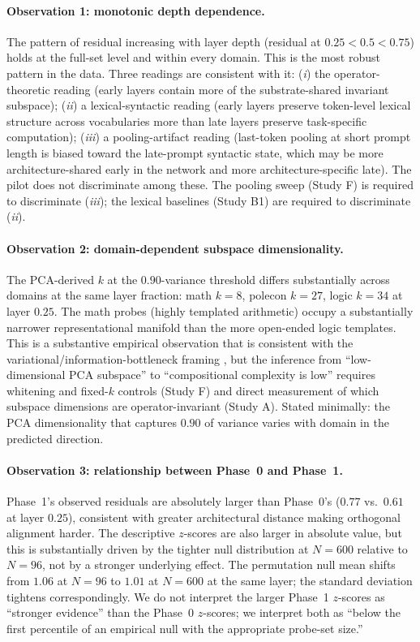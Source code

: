 \paragraph{Observation 1: monotonic depth dependence.} The pattern of
residual increasing with layer depth (residual at $0.25 < 0.5 < 0.75$)
holds at the full-set level and within every domain. This is the most
robust pattern in the data. Three readings are consistent with it:
(\emph{i}) the operator-theoretic reading (early layers contain more
of the substrate-shared invariant subspace); (\emph{ii}) a
lexical-syntactic reading (early layers preserve token-level lexical
structure across vocabularies more than late layers preserve
task-specific computation); (\emph{iii}) a pooling-artifact reading
(last-token pooling at short prompt length is biased toward the
late-prompt syntactic state, which may be more architecture-shared
early in the network and more architecture-specific late). The pilot
does not discriminate among these. The pooling sweep (Study F) is
required to discriminate (\emph{iii}); the lexical baselines (Study B1)
are required to discriminate (\emph{ii}).

\paragraph{Observation 2: domain-dependent subspace dimensionality.}
The PCA-derived $k$ at the $0.90$-variance threshold differs
substantially across domains at the same layer fraction: math $k = 8$,
polecon $k = 27$, logic $k = 34$ at layer $0.25$. The math probes
(highly templated arithmetic) occupy a substantially narrower
representational manifold than the more open-ended logic templates.
This is a substantive empirical observation that is consistent with
the variational/information-bottleneck framing
\cite{tishby2015deep, friston2010free, achille2018emergence}, but the
inference from ``low-dimensional PCA subspace'' to ``compositional
complexity is low'' requires whitening and fixed-$k$ controls (Study
F) and direct measurement of which subspace dimensions are
operator-invariant (Study A). Stated minimally: the PCA dimensionality
that captures $0.90$ of variance varies with domain in the predicted
direction.

\paragraph{Observation 3: relationship between Phase~0 and Phase~1.}
Phase~1's observed residuals are absolutely larger than Phase~0's
($0.77$ vs.\ $0.61$ at layer $0.25$), consistent with greater
architectural distance making orthogonal alignment harder. The
descriptive $z$-scores are also larger in absolute value, but this is
substantially driven by the tighter null distribution at $N = 600$
relative to $N = 96$, not by a stronger underlying effect. The
permutation null mean shifts from $1.06$ at $N = 96$ to $1.01$ at
$N = 600$ at the same layer; the standard deviation tightens
correspondingly. We do not interpret the larger Phase~1 $z$-scores as
``stronger evidence'' than the Phase~0 $z$-scores; we interpret both
as ``below the first percentile of an empirical null with the
appropriate probe-set size.''


